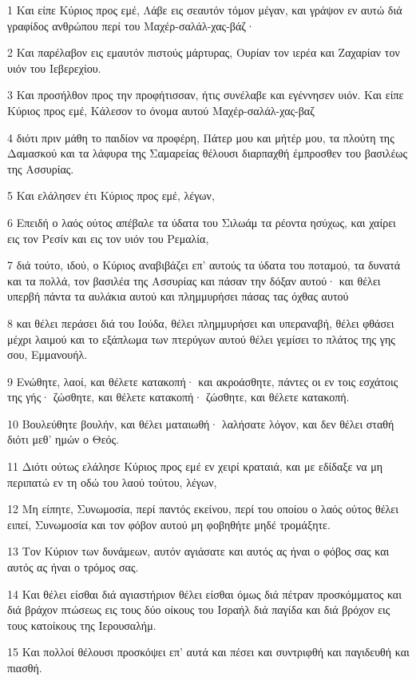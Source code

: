 \par 1 Και είπε Κύριος προς εμέ, Λάβε εις σεαυτόν τόμον μέγαν, και γράψον εν αυτώ διά γραφίδος ανθρώπου περί του Μαχέρ-σαλάλ-χας-βάζ·
\par 2 Και παρέλαβον εις εμαυτόν πιστούς μάρτυρας, Ουρίαν τον ιερέα και Ζαχαρίαν τον υιόν του Ιεβερεχίου.
\par 3 Και προσήλθον προς την προφήτισσαν, ήτις συνέλαβε και εγέννησεν υιόν. Και είπε Κύριος προς εμέ, Κάλεσον το όνομα αυτού Μαχέρ-σαλάλ-χας-βαζ
\par 4 διότι πριν μάθη το παιδίον να προφέρη, Πάτερ μου και μήτέρ μου, τα πλούτη της Δαμασκού και τα λάφυρα της Σαμαρείας θέλουσι διαρπαχθή έμπροσθεν του βασιλέως της Ασσυρίας.
\par 5 Και ελάλησεν έτι Κύριος προς εμέ, λέγων,
\par 6 Επειδή ο λαός ούτος απέβαλε τα ύδατα του Σιλωάμ τα ρέοντα ησύχως, και χαίρει εις τον Ρεσίν και εις τον υιόν του Ρεμαλία,
\par 7 διά τούτο, ιδού, ο Κύριος αναβιβάζει επ' αυτούς τα ύδατα του ποταμού, τα δυνατά και τα πολλά, τον βασιλέα της Ασσυρίας και πάσαν την δόξαν αυτού· και θέλει υπερβή πάντα τα αυλάκια αυτού και πλημμυρήσει πάσας τας όχθας αυτού
\par 8 και θέλει περάσει διά του Ιούδα, θέλει πλημμυρήσει και υπεραναβή, θέλει φθάσει μέχρι λαιμού και το εξάπλωμα των πτερύγων αυτού θέλει γεμίσει το πλάτος της γης σου, Εμμανουήλ.
\par 9 Ενώθητε, λαοί, και θέλετε κατακοπή· και ακροάσθητε, πάντες οι εν τοις εσχάτοις της γής· ζώσθητε, και θέλετε κατακοπή· ζώσθητε, και θέλετε κατακοπή.
\par 10 Βουλεύθητε βουλήν, και θέλει ματαιωθή· λαλήσατε λόγον, και δεν θέλει σταθή διότι μεθ' ημών ο Θεός.
\par 11 Διότι ούτως ελάλησε Κύριος προς εμέ εν χειρί κραταιά, και με εδίδαξε να μη περιπατώ εν τη οδώ του λαού τούτου, λέγων,
\par 12 Μη είπητε, Συνωμοσία, περί παντός εκείνου, περί του οποίου ο λαός ούτος θέλει ειπεί, Συνωμοσία και τον φόβον αυτού μη φοβηθήτε μηδέ τρομάξητε.
\par 13 Τον Κύριον των δυνάμεων, αυτόν αγιάσατε και αυτός ας ήναι ο φόβος σας και αυτός ας ήναι ο τρόμος σας.
\par 14 Και θέλει είσθαι διά αγιαστήριον θέλει είσθαι όμως διά πέτραν προσκόμματος και διά βράχον πτώσεως εις τους δύο οίκους του Ισραήλ διά παγίδα και διά βρόχον εις τους κατοίκους της Ιερουσαλήμ.
\par 15 Και πολλοί θέλουσι προσκόψει επ' αυτά και πέσει και συντριφθή και παγιδευθή και πιασθή.
